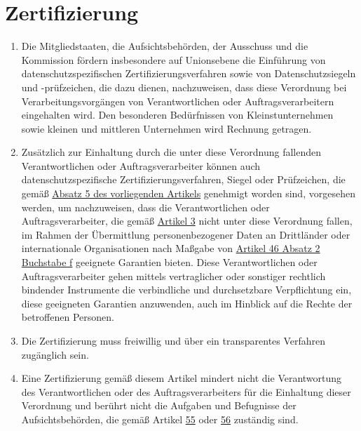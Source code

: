 \chapter{Zertifizierung}
\label{ch:42}


\begin{enumerate}

  \item Die Mitgliedstaaten, die Aufsichtsbehörden, der Ausschuss und die Kommission fördern insbesondere auf
   Unionsebene die Einführung von datenschutzspezifischen Zertifizierungsverfahren sowie von Datenschutzsiegeln
   und -prüfzeichen, die dazu dienen, nachzuweisen, dass diese Verordnung bei Verarbeitungsvorgängen von
   Verantwortlichen oder Auftragsverarbeitern eingehalten wird. Den besonderen Bedürfnissen von Kleinstunternehmen
   sowie kleinen und mittleren Unternehmen wird Rechnung getragen.
  \label{itm:42-1}

  \item Zusätzlich zur Einhaltung durch die unter diese Verordnung fallenden Verantwortlichen oder Auftragsverarbeiter
   können auch datenschutzspezifische Zertifizierungsverfahren, Siegel oder Prüfzeichen, die gemäß \hyperref[itm:42-5]
   {Absatz 5 des vorliegenden Artikels} genehmigt worden sind, vorgesehen werden, um nachzuweisen, dass die
   Verantwortlichen oder Auftragsverarbeiter, die gemäß \hyperref[ch:3]{Artikel 3} nicht unter diese Verordnung
   fallen, im Rahmen der Übermittlung personenbezogener Daten an Drittländer oder internationale Organisationen nach
   Maßgabe von \hyperref[itm:46-2f]{Artikel 46 Absatz 2 Buchstabe f} geeignete Garantien bieten. Diese Verantwortlichen
   oder Auftragsverarbeiter gehen mittels vertraglicher oder sonstiger rechtlich bindender Instrumente die verbindliche
   und durchsetzbare Verpflichtung ein, diese geeigneten Garantien anzuwenden, auch im Hinblick auf die Rechte der
   betroffenen Personen.
  \label{itm:42-2}

  \item Die Zertifizierung muss freiwillig und über ein transparentes Verfahren zugänglich sein.
  \label{itm:42-3}

  \item Eine Zertifizierung gemäß diesem Artikel mindert nicht die Verantwortung des Verantwortlichen oder des
   Auftragsverarbeiters für die Einhaltung dieser Verordnung und berührt nicht die Aufgaben und Befugnisse der
   Aufsichtsbehörden, die gemäß Artikel \hyperref[ch:55]{55} oder \hyperref[ch:56]{56} zuständig sind.
  \label{itm:42-4}


\end{enumerate}
